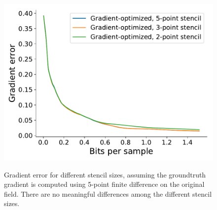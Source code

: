 \begin{figure}
	{\includegraphics[width=0.48\linewidth]{img/gradient/compare-stencils/gradient-optimized-velocityz.pdf}}
	\caption{Gradient error for different stencil sizes, assuming the groundtruth gradient is computed
	using 5-point finite difference on the original field. There are no meaningful differences among
	the different stencil sizes.}
	\label{fig:gradient-error-comparison}
\end{figure}

